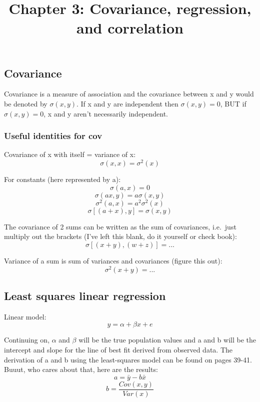 \documentclass[
]{article}
\title{Chapter 3: Covariance, regression, and correlation}
\author{}
\date{\vspace{-2.5em}}
\begin{document}
\maketitle

\hypertarget{covariance}{%
\subsection{Covariance}\label{covariance}}

Covariance is a measure of association and the covariance between x and
y would be denoted by \(\sigma(x, y)\). If x and y are independent then
\(\sigma(x, y) = 0\), BUT if \(\sigma(x, y) = 0\), x and y aren't
necessarily independent.

\hypertarget{useful-identities-for-cov}{%
\subsubsection{Useful identities for
cov}\label{useful-identities-for-cov}}

Covariance of x with itself = variance of x:
\[\sigma(x, x) = \sigma^2(x)\]

For constants (here represented by a): \[\sigma(a, x) = 0\]
\[\sigma(ax, y) = a\sigma(x, y)\] \[\sigma^2(a, x) = a^2\sigma^2(x)\]
\[\sigma[(a + x), y] = \sigma(x, y)\]

The covariance of 2 sums can be written as the sum of covariances,
i.e.~just multiply out the brackets (I've left this blank, do it
yourself or check book): \[\sigma[(x + y),(w + z)] = ...\]

Variance of a sum is sum of variances and covariances (figure this out):
\[\sigma^2(x + y) = ...\]

\hypertarget{least-squares-linear-regression}{%
\subsection{Least squares linear
regression}\label{least-squares-linear-regression}}

Linear model: \[y = \alpha + \beta{x} + e\]

Continuing on, \(\alpha\) and \(\beta\) will be the true population
values and a and b will be the intercept and slope for the line of best
fit derived from observed data. The derivation of a and b using the
least-squares model can be found on pages 39-41. Buuut, who cares about
that, here are the results: \[a = \bar{y} - b\bar{x}\]
\[b = \frac{Cov(x, y)} {Var(x)}\]
\end{document}
